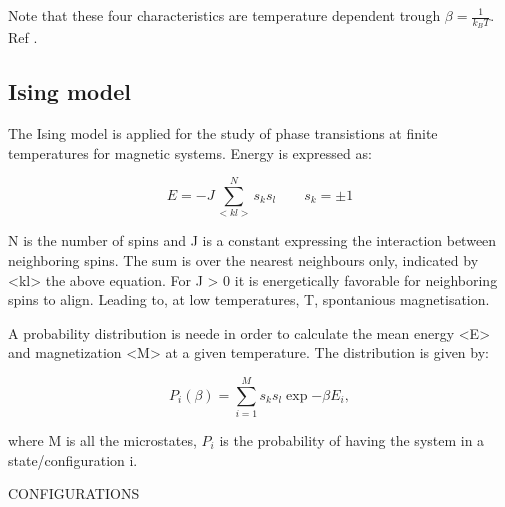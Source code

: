 \documentclass[../main.tex]{subfiles}
\begin{document}
    \noindent Note that these four characteristics are temperature dependent trough $\beta = \frac{1}{k_B T}$.\\
    Ref \cite{Mortenstatphys2019}.


    \subsection{Ising model}
    The Ising model is applied for the study of phase transistions at finite temperatures
    for magnetic systems. Energy is expressed as:

    \begin{equation}
      E = -J \sum  _{<kl>}^N s_ks_l \qquad s_k = \pm 1
    \end{equation}

    N is the number of spins and J is a constant expressing the interaction between neighboring spins. The sum is over the nearest neighbours only, indicated by <kl> the above equation. For J > 0 it is energetically favorable for neighboring spins to align. Leading to, at low temperatures, T, spontanious magnetisation.

    A probability distribution is neede in order to calculate the mean energy <E> and magnetization <M> at a given temperature. The distribution is given by:

    \begin{equation}
      P_i(\beta)=  \sum  _{i = 1}^M s_ks_l \exp{-\beta E_i},
    \end{equation}

    where M is all the microstates, $P_i$ is the probability of having the system in a state/configuration i.

    CONFIGURATIONS
\end{document}
